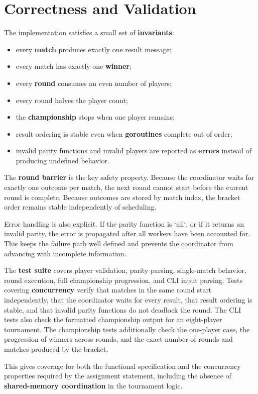 \section{Correctness and Validation}

The implementation satisfies a small set of \textbf{invariants}:
\begin{itemize}
    \item every \textbf{match} produces exactly one result message;
    \item every match has exactly one \textbf{winner};
    \item every \textbf{round} consumes an even number of players;
    \item every round halves the player count;
    \item the \textbf{championship} stops when one player remains;
    \item result ordering is stable even when \textbf{goroutines} complete out of order;
    \item invalid parity functions and invalid players are reported as \textbf{errors} instead of producing undefined behavior.
\end{itemize}

The \textbf{round barrier} is the key safety property.
Because the coordinator waits for exactly one outcome per match, the next round cannot start before the current round
is complete.
Because outcomes are stored by match index, the bracket order remains stable independently of scheduling.

Error handling is also explicit.
If the parity function is `nil`, or if it returns an invalid parity, the error is propagated after all workers have been
accounted for.
This keeps the failure path well defined and prevents the coordinator from advancing with incomplete information.

The \textbf{test suite} covers player validation, parity parsing, single-match behavior, round execution, full championship
progression, and CLI input parsing.
Tests covering \textbf{concurrency} verify that matches in the same round start independently, that the coordinator waits for
every result, that result ordering is stable, and that invalid parity functions do not deadlock the round.
The CLI tests also check the formatted championship output for an eight-player tournament.
The championship tests additionally check the one-player case, the progression of winners across rounds, and the exact
number of rounds and matches produced by the bracket.

This gives coverage for both the functional specification and the concurrency properties required by the assignment
statement, including the absence of \textbf{shared-memory coordination} in the tournament logic.
